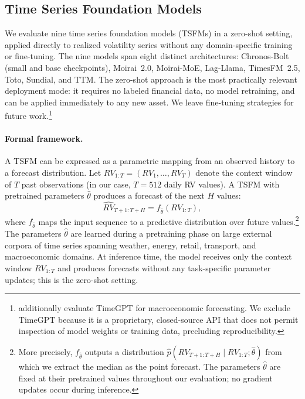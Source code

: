\documentclass[12pt]{article}
\begin{document}
\subsection{Time Series Foundation Models}
\label{subsec:tsfm_method}

We evaluate nine time series foundation models (TSFMs) in a zero-shot setting, applied directly to realized volatility series without any domain-specific training or fine-tuning. The nine models span eight distinct architectures: Chronos-Bolt (small and base checkpoints), Moirai~2.0, Moirai-MoE, Lag-Llama, TimesFM~2.5, Toto, Sundial, and TTM. The zero-shot approach is the most practically relevant deployment mode: it requires no labeled financial data, no model retraining, and can be applied immediately to any new asset. We leave fine-tuning strategies for future work.\footnote{\citet{carriero2024macro} additionally evaluate TimeGPT \citep{garza2024timegpt} for macroeconomic forecasting. We exclude TimeGPT because it is a proprietary, closed-source API that does not permit inspection of model weights or training data, precluding reproducibility.}

\paragraph{Formal framework.}
A TSFM can be expressed as a parametric mapping from an observed history to a forecast distribution. Let $RV_{1:T} = (RV_1, \ldots, RV_T)$ denote the context window of $T$ past observations (in our case, $T = 512$ daily RV values). A TSFM with pretrained parameters $\hat{\theta}$ produces a forecast of the next $H$ values:
\begin{equation}
  \widehat{RV}_{T+1:T+H} = f_{\hat{\theta}}(RV_{1:T}),
  \label{eq:tsfm}
\end{equation}
where $f_{\hat{\theta}}$ maps the input sequence to a predictive distribution over future values.\footnote{More precisely, $f_{\hat{\theta}}$ outputs a distribution $\hat{p}(RV_{T+1:T+H} \mid RV_{1:T}; \hat{\theta})$ from which we extract the median as the point forecast. The parameters $\hat{\theta}$ are fixed at their pretrained values throughout our evaluation; no gradient updates occur during inference.} The parameters $\hat{\theta}$ are learned during a pretraining phase on large external corpora of time series spanning weather, energy, retail, transport, and macroeconomic domains. At inference time, the model receives only the context window $RV_{1:T}$ and produces forecasts without any task-specific parameter updates; this is the zero-shot setting.
\end{document}

